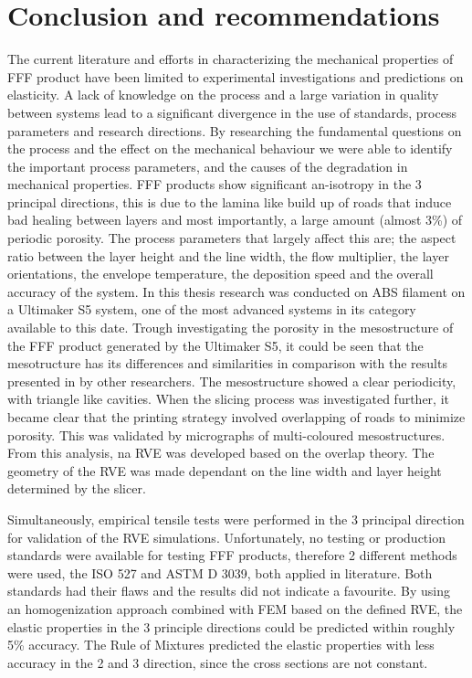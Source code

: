 \chapter{Conclusion and recommendations}
\label{chp:conclusion}

The current literature and efforts in characterizing the mechanical properties of FFF product have been limited to experimental investigations and predictions on elasticity. A lack of knowledge on the process and a large variation in quality between systems lead to a significant divergence in the use of standards, process parameters and research directions. By researching the fundamental questions on the process and the effect on the mechanical behaviour we were able to identify the important process parameters, and the causes of the degradation in mechanical properties. FFF products show significant an-isotropy in the 3 principal directions, this is due to the lamina like build up of roads that induce bad healing between layers and most importantly, a large amount (almost 3\%) of periodic porosity. The process parameters that largely affect this are; the aspect ratio between the layer height and the line width, the flow multiplier, the layer orientations, the envelope temperature, the deposition speed and the overall accuracy of the system.  In this thesis research was conducted on ABS filament on a Ultimaker S5 system, one of the most advanced systems in its category available to this date. Trough investigating the porosity in the mesostructure of the FFF product generated by the Ultimaker S5, it could be seen that the mesotructure has its differences and similarities in comparison with the results presented in by other researchers. The mesostructure showed a clear periodicity, with triangle like cavities. When the slicing process was investigated further, it became clear that the printing strategy involved overlapping of roads to minimize porosity. This was validated by micrographs of multi-coloured mesostructures. From this analysis, na RVE was developed based on the overlap theory. The geometry of the RVE was made dependant on the line width and layer height determined by the slicer. 

Simultaneously, empirical tensile tests were performed in the 3 principal direction for validation of the RVE simulations. Unfortunately, no testing or production standards were available for testing FFF products, therefore 2 different methods were used, the ISO 527 and ASTM D 3039, both applied in literature. Both standards had their flaws and the results did not indicate a favourite.  
By using an homogenization approach combined with FEM based on the defined RVE, the elastic properties in the 3 principle directions could be predicted within roughly 5\% accuracy. The Rule of Mixtures predicted the elastic properties with less accuracy in the 2 and 3 direction, since the cross sections are not constant. 

